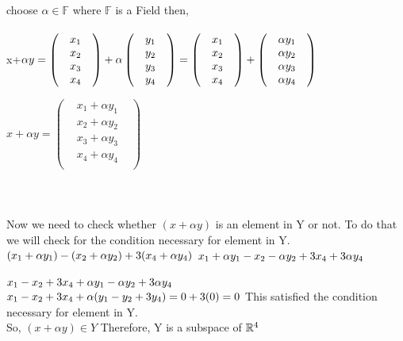 \documentclass[45pt]{article}
\begin{document}
\begin{enumerate}
choose $\alpha \in \mathbb{F}$ where $\mathbb{F}$ is a Field then, \\\\
x+$\alpha y= \begin{pmatrix}
    & x_1  \\
    & x_2 & \\
    & x_3 & \\
    & x_4 & \\
    \end{pmatrix} + \alpha \begin{pmatrix}
    & y_1  \\
    & y_2 & \\
    & y_3 & \\
    & y_4 & \\
    \end{pmatrix} =
    \begin{pmatrix}
    & x_1  \\
    & x_2 & \\
    & x_3 & \\
    & x_4 & \\
    \end{pmatrix} +
    \begin{pmatrix}
    & \alpha y_1  \\
    & \alpha y_2 & \\
    & \alpha y_3 & \\
    & \alpha y_4 & \\
    \end{pmatrix}\\\\$
    
    $ x+ \alpha y = 
    \begin{pmatrix}
    & x_1 + \alpha y_1  \\
    & x_2 + \alpha y_2& \\
    & x_3 + \alpha y_3& \\
    & x_4 + \alpha y_4& \\
    \end{pmatrix} $ \\\\\\\\
Now we need to check whether $(x+ \alpha y )$ is an element in Y or not.  To do that we will check for the condition necessary for element in Y.\\

$(x_1+\alpha y_1) - (x_2+\alpha y_2) +3(x_4+\alpha y_4)\\\\$ 
$x_1+\alpha y_1 - x_2-\alpha y_2 +3x_4+3\alpha y_4\\\\$
 \\\\
$x_1-x_2+3x_4+\alpha y_1-\alpha y_2+3\alpha y_4\\$
$x_1-x_2+3x_4+\alpha (y_1-y_2+3 y_4) = 0+3(0)=0\\\\$
This satisfied the condition necessary for element in Y.\\
So, $(x + \alpha y )\in Y$
Therefore, Y is a subspace of $\mathbb{R}^4\\$


\end{enumerate}
\end{document}
